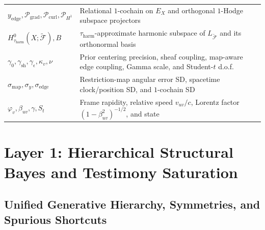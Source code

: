 \documentclass[11pt,a4paper]{article}
\theoremstyle{definition}
\theoremstyle{remark}
\newcommand{\Pgrad}{\mathcal{P}_{\mathrm{grad}}}
\newcommand{\Pcurl}{\mathcal{P}_{\mathrm{curl}}}
\newcommand{\Pharm}{\mathcal{P}_{H^1}}
\begin{document}
\begin{table}[t]
\begin{tabular}{@{}lp{}@{}}
$y_{\mathrm{edge}}, \Pgrad, \Pcurl, \Pharm$ & Relational $1$-cochain on $E_X$ and orthogonal $1$-Hodge subspace projectors \\
$H^0_{\tau_{\mathrm{harm}}}(X;\widetilde{\mathcal{F}}), B$ & $\tau_{\mathrm{harm}}$-approximate harmonic subspace of $L_{\widetilde{\mathcal{F}}}$ and its orthonormal basis \\
$\gamma_0, \gamma_{\mathrm{sh}}, \gamma_\epsilon, \kappa_v, \nu$ & Prior centering precision, sheaf coupling, map-aware edge coupling, Gamma scale, and Student-$t$ d.o.f. \\
$\sigma_{\mathrm{map}}, \sigma_y, \sigma_{\mathrm{edge}}$ & Restriction-map angular error SD, spacetime clock/position SD, and $1$-cochain SD \\
$\varphi_v, \beta_{uv}, \gamma, S_t$ & Frame rapidity, relative speed $v_{uv}/c$, Lorentz factor $(1-\beta_{uv}^2)^{-1/2}$, and state \\
\bottomrule
\end{tabular}
\end{table}

\section{Layer 1: Hierarchical Structural Bayes and Testimony Saturation}
\label{sec:hierarchical}

\subsection{Unified Generative Hierarchy, Symmetries, and Spurious Shortcuts}
\end{document}

